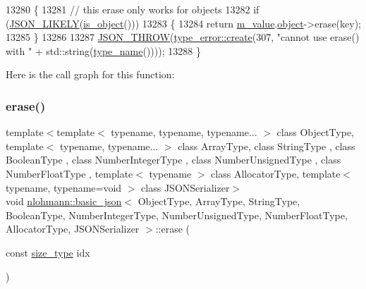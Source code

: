 \begin{DoxyCode}
13280     \{
13281         \textcolor{comment}{// this erase only works for objects}
13282         \textcolor{keywordflow}{if} (\hyperlink{json_8hpp_a41ecd1c4cf7c3d56477b9b685b5daa72}{JSON\_LIKELY}(\hyperlink{classnlohmann_1_1basic__json_af8f511af124e82e4579f444b4175787c}{is\_object}()))
13283         \{
13284             \textcolor{keywordflow}{return} \hyperlink{classnlohmann_1_1basic__json_aeb0814f76966f99290cb29e127c90a77}{m\_value}.\hyperlink{unionnlohmann_1_1basic__json_1_1json__value_a4a2209bb26e7088cd36bf24824ab5521}{object}->erase(key);
13285         \}
13286 
13287         \hyperlink{json_8hpp_a6c274f6db2e65c1b66c7d41b06ad690f}{JSON\_THROW}(\hyperlink{classnlohmann_1_1detail_1_1type__error_aecc083aea4b698c33d042670ba50c10f}{type\_error::create}(307, \textcolor{stringliteral}{"cannot use erase() with "} + 
      std::string(\hyperlink{classnlohmann_1_1basic__json_a9d0a478571f82f0163b96b2424cd998f}{type\_name}())));
13288     \}
\end{DoxyCode}
Here is the call graph for this function\+:
\mbox{\label{classnlohmann_1_1basic__json_a88cbcefe9a3f4d294bed0653550a5cb9}} 
\subsubsection{\texorpdfstring{erase()}{erase()}\hspace{0.1cm}{\footnotesize\ttfamily [4/4]}}
{\footnotesize\ttfamily template$<$template$<$ typename, typename, typename... $>$ class Object\+Type, template$<$ typename, typename... $>$ class Array\+Type, class String\+Type , class Boolean\+Type , class Number\+Integer\+Type , class Number\+Unsigned\+Type , class Number\+Float\+Type , template$<$ typename $>$ class Allocator\+Type, template$<$ typename, typename=void $>$ class J\+S\+O\+N\+Serializer$>$ \\
void \hyperlink{classnlohmann_1_1basic__json}{nlohmann\+::basic\+\_\+json}$<$ Object\+Type, Array\+Type, String\+Type, Boolean\+Type, Number\+Integer\+Type, Number\+Unsigned\+Type, Number\+Float\+Type, Allocator\+Type, J\+S\+O\+N\+Serializer $>$\+::erase (\begin{DoxyParamCaption}\item[{const \hyperlink{classnlohmann_1_1basic__json_a39f2cd0b58106097e0e67bf185cc519b}{size\+\_\+type}}]{idx }\end{DoxyParamCaption})\hspace{0.3cm}{\ttfamily [inline]}}



